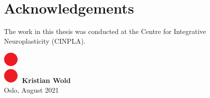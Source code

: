 \chapter*{Acknowledgements}
\thispagestyle{plain}

The work in this thesis was conducted at the Centre for Integrative Neuroplasticity (CINPLA).
\\ [8 pt]

\begin{flushright}
\includegraphics[height = 1.5ex]{latex/latex-report/3_Images/Logo/UiO/uio-colon.pdf}\, \textbf{Kristian Wold}
\\
Oslo, August 2021
\end{flushright}
